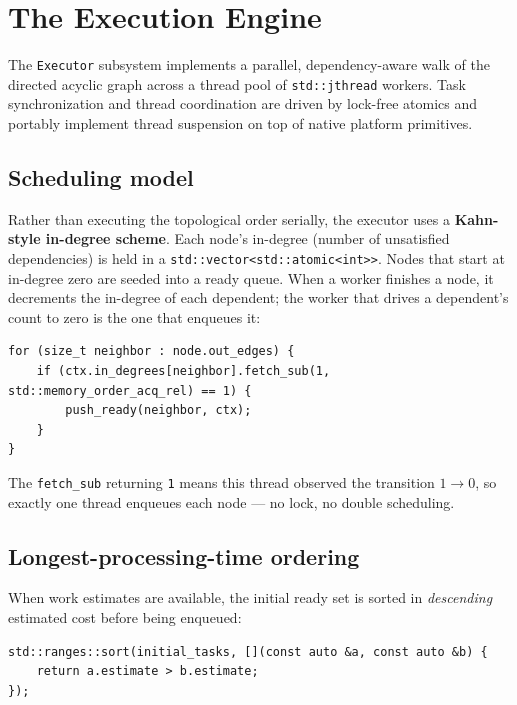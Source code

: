 \documentclass[11pt]{article}
\begin{document}
\section{The Execution Engine}\label{sec:exec}

The \lstinline|Executor| subsystem implements a parallel, dependency-aware walk
of the directed acyclic graph across a thread pool of \lstinline|std::jthread|
workers. Task synchronization and thread coordination are driven by lock-free
atomics and portably implement thread suspension on top of native platform
primitives.

\subsection{Scheduling model}

Rather than executing the topological order serially, the executor uses a
\textbf{Kahn-style in-degree scheme}. Each node's in-degree (number of
unsatisfied dependencies) is held in a \lstinline|std::vector<std::atomic<int>>|.
Nodes that start at in-degree zero are seeded into a ready queue. When a worker
finishes a node, it decrements the in-degree of each dependent; the worker that
drives a dependent's count to zero is the one that enqueues it:

\begin{lstlisting}
for (size_t neighbor : node.out_edges) {
    if (ctx.in_degrees[neighbor].fetch_sub(1, std::memory_order_acq_rel) == 1) {
        push_ready(neighbor, ctx);
    }
}
\end{lstlisting}

The \lstinline|fetch_sub| returning \lstinline|1| means this thread observed the
transition $1\rightarrow 0$, so exactly one thread enqueues each node --- no lock,
no double scheduling.

\subsection{Longest-processing-time ordering}

When work estimates are available, the initial ready set is sorted in
\emph{descending} estimated cost before being enqueued:

\begin{lstlisting}
std::ranges::sort(initial_tasks, [](const auto &a, const auto &b) {
    return a.estimate > b.estimate;
});
\end{lstlisting}
\end{document}
